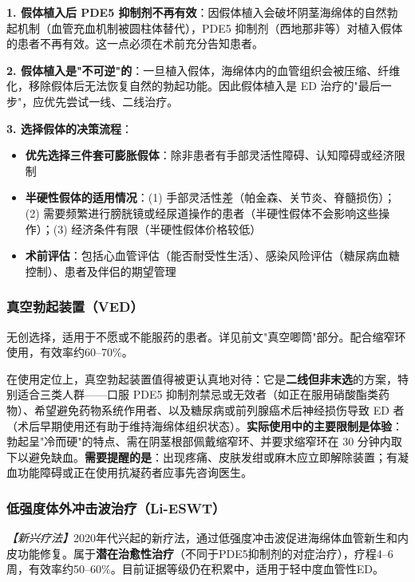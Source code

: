 \documentclass[12pt,a4paper,twoside]{ctexbook}
\begin{document}
\begin{tcolorbox}[colback=pink!5!white,colframe=red!50!black,title=贴心小叮咛]
\textbf{1. 假体植入后 PDE5 抑制剂不再有效}：因假体植入会破坏阴茎海绵体的自然勃起机制（血管充血机制被圆柱体替代），PDE5 抑制剂（西地那非等）对植入假体的患者不再有效。这一点必须在术前充分告知患者。

\textbf{2. 假体植入是"不可逆"的}：一旦植入假体，海绵体内的血管组织会被压缩、纤维化，移除假体后无法恢复自然的勃起功能。因此假体植入是 ED 治疗的"最后一步"，应优先尝试一线、二线治疗。

\textbf{3. 选择假体的决策流程}：
\begin{itemize}
	\item \textbf{优先选择三件套可膨胀假体}：除非患者有手部灵活性障碍、认知障碍或经济限制
	\item \textbf{半硬性假体的适用情况}：(1) 手部灵活性差（帕金森、关节炎、脊髓损伤）；(2) 需要频繁进行膀胱镜或经尿道操作的患者（半硬性假体不会影响这些操作）；(3) 经济条件有限（半硬性假体价格较低）
	\item \textbf{术前评估}：包括心血管评估（能否耐受性生活）、感染风险评估（糖尿病血糖控制）、患者及伴侣的期望管理
\end{itemize}
\end{tcolorbox}

\subsubsection{真空勃起装置（VED）}

无创选择，适用于不愿或不能服药的患者。详见前文"真空唧筒"部分。配合缩窄环使用，有效率约60--70\%。


在使用定位上，真空勃起装置值得被更认真地对待：它是\textbf{二线但非末选}的方案，特别适合三类人群——口服 PDE5 抑制剂禁忌或无效者（如正在服用硝酸酯类药物）、希望避免药物系统作用者、以及糖尿病或前列腺癌术后神经损伤导致 ED 者（术后早期使用还有助于维持海绵体组织状态）。\textbf{实际使用中的主要限制是体验}：勃起呈"冷而硬"的特点、需在阴茎根部佩戴缩窄环、并要求缩窄环在 30 分钟内取下以避免缺血。\textbf{需要提醒的是}：出现疼痛、皮肤发绀或麻木应立即解除装置；有凝血功能障碍或正在使用抗凝药者应事先咨询医生。

\subsubsection{低强度体外冲击波治疗（Li-ESWT）}

\textit{【新兴疗法】}2020年代兴起的新疗法，通过低强度冲击波促进海绵体血管新生和内皮功能修复。属于\textbf{潜在治愈性治疗}（不同于PDE5抑制剂的对症治疗），疗程4--6周，有效率约50--60\%。目前证据等级仍在积累中，适用于轻中度血管性ED。
\end{document}
